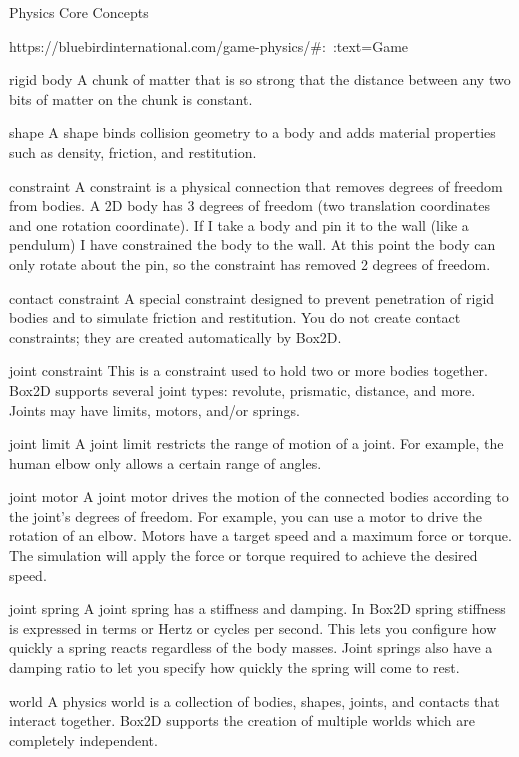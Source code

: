 \documentclass{projdoc}
\begin{document}
Physics Core Concepts

https://bluebirdinternational.com/game-physics/#:~:text=Game%

rigid body
A chunk of matter that is so strong that the distance between any two bits of matter on the chunk is constant.

shape
A shape binds collision geometry to a body and adds material properties such as density, friction, and restitution.

constraint
A constraint is a physical connection that removes degrees of freedom from bodies. A 2D body has 3 degrees of freedom (two translation coordinates and one rotation coordinate). If I take a body and pin it to the wall (like a pendulum) I have constrained the body to the wall. At this point the body can only rotate about the pin, so the constraint has removed 2 degrees of freedom.

contact constraint
A special constraint designed to prevent penetration of rigid bodies and to simulate friction and restitution. You do not create contact constraints; they are created automatically by Box2D.

joint constraint
This is a constraint used to hold two or more bodies together. Box2D supports several joint types: revolute, prismatic, distance, and more. Joints may have limits, motors, and/or springs.

joint limit
A joint limit restricts the range of motion of a joint. For example, the human elbow only allows a certain range of angles.

joint motor
A joint motor drives the motion of the connected bodies according to the joint's degrees of freedom. For example, you can use a motor to drive the rotation of an elbow. Motors have a target speed and a maximum force or torque. The simulation will apply the force or torque required to achieve the desired speed.

joint spring
A joint spring has a stiffness and damping. In Box2D spring stiffness is expressed in terms or Hertz or cycles per second. This lets you configure how quickly a spring reacts regardless of the body masses. Joint springs also have a damping ratio to let you specify how quickly the spring will come to rest.

world
A physics world is a collection of bodies, shapes, joints, and contacts that interact together. Box2D supports the creation of multiple worlds which are completely independent.
\end{document}
